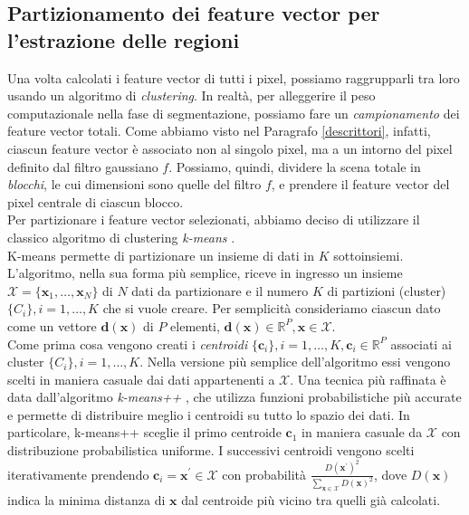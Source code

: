 \subsection{Partizionamento dei feature vector per l'estrazione delle regioni}
Una volta calcolati i feature vector di tutti i pixel, possiamo raggrupparli tra loro usando un algoritmo di \textit{clustering}.
In realt\`a, per alleggerire il peso computazionale nella fase di segmentazione, possiamo fare un \textit{campionamento} dei feature vector totali.
Come abbiamo visto nel Paragrafo \ref{descrittori}, infatti, ciascun feature vector \`e associato non al singolo pixel, ma a un intorno del pixel definito dal filtro gaussiano $f$.
Possiamo, quindi, dividere la scena totale in \textit{blocchi}, le cui dimensioni sono quelle del filtro $f$, e prendere il feature vector del pixel centrale di ciascun blocco.\\ 
Per partizionare i feature vector selezionati, abbiamo deciso di utilizzare il classico algoritmo di clustering \textit{k-means} \cite{han2006data, lloyd1982least}.\\
K-means permette di partizionare un insieme di dati in $K$ sottoinsiemi.
L'algoritmo, nella sua forma pi\`u semplice, riceve in ingresso un insieme $\mathcal{X} = \{\textbf{x}_1,\dots,\textbf{x}_N\}$ di $N$ dati da partizionare e il numero $K$ di partizioni (cluster) $\{C_i\}, i=1,\dots,K$ che si vuole creare.
Per semplicit\`a consideriamo ciascun dato come un vettore $\textbf{d}(\textbf{x})$ di $P$ elementi, $\textbf{d}(\textbf{x})\in\mathbb{R}^P, \textbf{x}\in \mathcal{X}$.\\
Come prima cosa vengono creati i \textit{centroidi} $\{\textbf{c}_i\}, i=1,\dots,K, \textbf{c}_i \in \mathbb{R}^P$ associati ai cluster $\{C_i\}, i=1,\dots,K$.
Nella versione pi\`u semplice dell'algoritmo essi vengono scelti in maniera casuale dai dati appartenenti a $\mathcal{X}$.
Una tecnica pi\`u raffinata \`e data dall'algoritmo \textit{k-means++} \cite{arthur2007k}, che utilizza funzioni probabilistiche pi\`u accurate e permette di distribuire meglio i centroidi su tutto lo spazio dei dati.
In particolare, k-means++ sceglie il primo centroide $\textbf{c}_1$ in maniera casuale da $\mathcal{X}$ con distribuzione probabilistica uniforme.
I successivi centroidi vengono scelti iterativamente prendendo $\textbf{c}_i=\textbf{x}^\prime\in\mathcal{X}$ con probabilit\`a $\frac{D(\textbf{x}^\prime)^2}{\sum_{\textbf{x}\in \mathcal{X}}D(\textbf{x})^2}$, dove $D(\textbf{x})$ indica la minima distanza di $\textbf{x}$ dal centroide pi\`u vicino tra quelli gi\`a calcolati.\\

